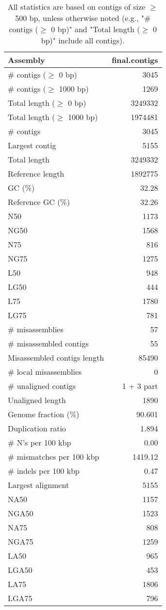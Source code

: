 \documentclass[12pt,a4paper]{article}
\begin{document}
\begin{table}[ht]
\begin{center}
\caption{All statistics are based on contigs of size $\geq$ 500 bp, unless otherwise noted (e.g., "\# contigs ($\geq$ 0 bp)" and "Total length ($\geq$ 0 bp)" include all contigs).}
\begin{tabular}{|l*{1}{|r}|}
\hline
Assembly & final.contigs \\ \hline
\# contigs ($\geq$ 0 bp) & 3045 \\ \hline
\# contigs ($\geq$ 1000 bp) & 1269 \\ \hline
Total length ($\geq$ 0 bp) & 3249332 \\ \hline
Total length ($\geq$ 1000 bp) & 1974481 \\ \hline
\# contigs & 3045 \\ \hline
Largest contig & 5155 \\ \hline
Total length & 3249332 \\ \hline
Reference length & 1892775 \\ \hline
GC (\%) & 32.28 \\ \hline
Reference GC (\%) & 32.26 \\ \hline
N50 & 1173 \\ \hline
NG50 & 1568 \\ \hline
N75 & 816 \\ \hline
NG75 & 1275 \\ \hline
L50 & 948 \\ \hline
LG50 & 444 \\ \hline
L75 & 1780 \\ \hline
LG75 & 781 \\ \hline
\# misassemblies & 57 \\ \hline
\# misassembled contigs & 55 \\ \hline
Misassembled contigs length & 85490 \\ \hline
\# local misassemblies & 0 \\ \hline
\# unaligned contigs & 1 + 3 part \\ \hline
Unaligned length & 1890 \\ \hline
Genome fraction (\%) & 90.601 \\ \hline
Duplication ratio & 1.894 \\ \hline
\# N's per 100 kbp & 0.00 \\ \hline
\# mismatches per 100 kbp & 1419.12 \\ \hline
\# indels per 100 kbp & 0.47 \\ \hline
Largest alignment & 5155 \\ \hline
NA50 & 1157 \\ \hline
NGA50 & 1523 \\ \hline
NA75 & 808 \\ \hline
NGA75 & 1259 \\ \hline
LA50 & 965 \\ \hline
LGA50 & 453 \\ \hline
LA75 & 1806 \\ \hline
LGA75 & 796 \\ \hline
\end{tabular}
\end{center}
\end{table}
\end{document}
